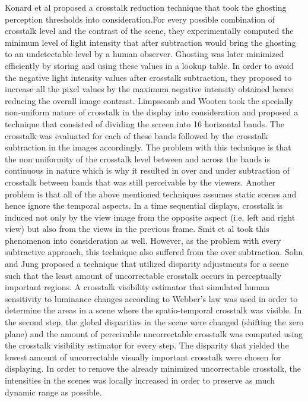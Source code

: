  Konard et al \cite{konrad2000cancellation} proposed a crosstalk reduction technique that took the ghosting perception thresholds into consideration.For every possible combination of crosstalk level and the contrast of the scene, they experimentally computed the minimum level of light intensity that after subtraction would bring the ghosting to an undetectable level by a human observer. Ghosting was later minimized efficiently by storing and using these values in a lookup table. In order to avoid the negative light intensity values after crosstalk subtraction, they proposed to increase all the pixel values by the maximum negative intensity obtained hence reducing the overall image contrast. Limpscomb and Wooten \cite{lipscomb1994reducing} took the specially non-uniform nature of crosstalk in the display into consideration and proposed a technique that consisted of dividing the screen into 16 horizontal bands. The crosstalk was evaluated for each of these bands followed by the crosstalk subtraction in the images accordingly. The problem with this technique is that the non uniformity of the crosstalk level between and across the bands is continuous in nature which is why it resulted in over and under subtraction of crosstalk between bands that was still perceivable by the viewers. Another problem is that all of the above mentioned techniques assumes static scenes and hence ignore the temporal aspects. In a time sequential displays, crosstalk is induced not only by the view image from the opposite aspect (i.e. left and right view) but also from the views in the previous frame. Smit et al \cite{smit2007non} took this phenomenon into consideration as well. However, as the problem with every subtractive approach, this technique also suffered from the over subtraction. Sohn and Jung \cite{sohn2014crosstalk} proposed a technique that utilized disparity adjustments for a scene such that the least amount of uncorrectable crosstalk occurs in perceptually important regions. A crosstalk visibility estimator that simulated human sensitivity to luminance changes according to Webber's law was used in order to determine the areas in a scene where the spatio-temporal crosstalk was visible. In the second step, the global disparities in the scene were changed (shifting the zero plane) and the amount of perceivable uncorrectable crosstalk was computed using the crosstalk visibility estimator for every step. The disparity that yielded the lowest amount of uncorrectable visually important crosstalk were chosen for displaying. In order to remove the already minimized uncorrectable crosstalk, the intensities in the scenes was locally increased in order to preserve as much dynamic range as possible.

